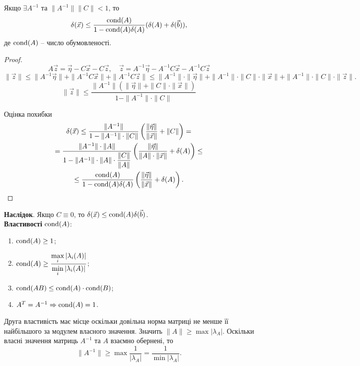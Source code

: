 \begin{theorem}
	Якщо $\exists A^{-1}$ та $\|A^{-1}\|\|C\|<1$, то
	\begin{equation}
		\label{eq:3.25}
		\delta(\vec x) \le \dfrac{\operatorname{cond} (A)}{1-\operatorname{cond} (A)\delta(A)}(\delta(A)+\delta(\vec b)),
	\end{equation}
	де $\operatorname{cond} (A)$ -- число обумовленості.
\end{theorem}
\begin{proof}
	\[A \vec z = \vec \eta - C \vec x - C \vec z, \quad \vec z = A^{-1} \vec \eta - A^{-1} C \vec x - A^{-1} C \vec z\]
	\[ \|\vec z\| \le \|A^{-1}\vec \eta\|+\|A^{-1}C\vec x\| +\|A^{-1}C\vec z\| \le \|A^{-1}\|\cdot\|\vec \eta\|+\|A^{-1}\|\cdot \|C\|\cdot \|\vec x\| +\|A^{-1}\|\cdot \|C\|\cdot \|\vec z\|. \]
	\[ \|\vec z\| \le \dfrac{\|A^{-1}\|(\|\vec\eta\|+\|C\|\cdot\|\vec x\|)}{1 - \|A^{-1}\| \cdot \|C\|} \]

	Оцінка похибки
	\begin{multline*}
		\delta(\vec x) \le \dfrac{\|A^{-1}\|}{1-\|A^{-1}\| \cdot \|C\|} \left(\dfrac{\|\vec \eta\|}{\|\vec x\|}+\|C\| \right) = \\
		= \dfrac{\|A^{-1}\|\cdot \|A\|}{1-\|A^{-1}\|\cdot\|A\|\cdot \dfrac{\|C\|}{\|A\|}} \left(\dfrac{\|\vec \eta\|}{\|A\|\cdot \|\vec x\|} + \delta(A) \right) \le \\
		\le \dfrac{\operatorname{cond} (A)}{1-\operatorname{cond} (A)\delta(A)}\left(\dfrac{\|\vec\eta\|}{\|\vec x\|}+\delta(A)\right).
	\end{multline*}
\end{proof}

\textbf{Наслідок}. Якщо $C \equiv 0$, то $\delta(\vec x) \le \operatorname{cond}  (A) \delta (\vec b)$. \\

\textbf{Властивості} $\operatorname{cond} (A)$:
\begin{enumerate}
	\item $\operatorname{cond} (A)\ge1$;
	\item $\operatorname{cond} (A)\ge\dfrac{\displaystyle\max\limits_i |\lambda_i(A)|}{\displaystyle\min\limits_i|\lambda_i(A)|}$;
	\item $\operatorname{cond} (AB) \le \operatorname{cond} (A) \cdot \operatorname{cond} (B)$;
	\item $A^T = A^{-1} \Rightarrow \operatorname{cond} (A) = 1$.
\end{enumerate}

Друга властивість має місце оскільки довільна норма матриці не менше її найбільшого за модулем власного значення. Значить $\|A\|\ge\max|\lambda_A|$. Оскільки власні значення матриць $A^{-1}$ та $A$ взаємно обернені, то \[ \|A^{-1}\| \ge \max \dfrac{1}{|\lambda_A|} = \dfrac{1}{\min|\lambda_A|}.\]

